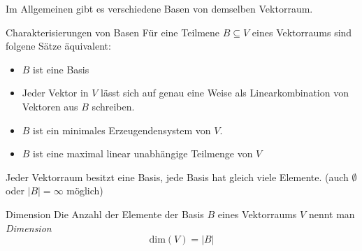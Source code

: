 Im Allgemeinen gibt es verschiedene Basen von demselben Vektorraum.

\begin{satz}{Charakterisierungen von Basen}
  Für eine Teilmene $B\subseteq V$ eines Vektorraums sind folgene Sätze äquivalent:
  \begin{itemize}
    \item $B$ ist eine Basis
    \item Jeder Vektor in $V$ lässt sich auf genau eine Weise als Linearkombination von Vektoren aus $B$ schreiben.
    \item $B$ ist ein minimales Erzeugendensystem von $V$.
    \item $B$ ist eine maximal linear unabhängige Teilmenge von $V$
  \end{itemize}
\end{satz}

\bemerkung
Jeder Vektorraum besitzt eine Basis, jede Basis hat gleich viele Elemente. (auch $\emptyset$ oder $|B|=\infty$ möglich)

\begin{definition}{Dimension}
	Die Anzahl der Elemente der Basis $B$ eines Vektorraums $V$ nennt man \emph{Dimension}
	\begin{equation*}
	  \mathrm{dim}(V)=|B|
	\end{equation*}
\end{definition}
